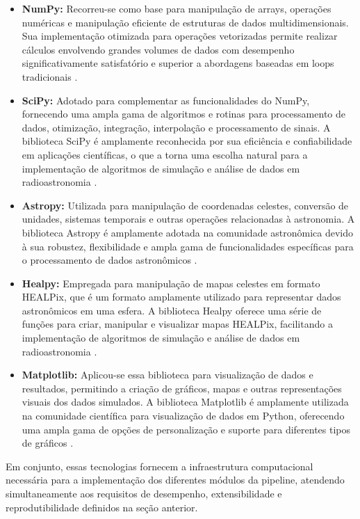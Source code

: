 \begin{itemize}
    \item \textbf{NumPy:} Recorreu-se como base para manipulação de arrays, operações numéricas e manipulação eficiente de estruturas de dados multidimensionais. Sua implementação otimizada para operações vetorizadas permite realizar cálculos envolvendo grandes volumes de dados com desempenho significativamente satisfatório e superior a abordagens baseadas em loops tradicionais \cite{harris2020array}.
    \item \textbf{SciPy:} Adotado para complementar as funcionalidades do NumPy, fornecendo uma ampla gama de algoritmos e rotinas para processamento de dados, otimização, integração, interpolação e processamento de sinais. A biblioteca SciPy é amplamente reconhecida por sua eficiência e confiabilidade em aplicações científicas, o que a torna uma escolha natural para a implementação de algoritmos de simulação e análise de dados em radioastronomia \cite{virtanen2020scipy}.
    \item \textbf{Astropy:} Utilizada para manipulação de coordenadas celestes, conversão de unidades, sistemas temporais e outras operações relacionadas à astronomia. A biblioteca Astropy é amplamente adotada na comunidade astronômica devido à sua robustez, flexibilidade e ampla gama de funcionalidades específicas para o processamento de dados astronômicos \cite{Astropy2022}.
    \item \textbf{Healpy:} Empregada para manipulação de mapas celestes em formato HEALPix, que é um formato amplamente utilizado para representar dados astronômicos em uma esfera. A biblioteca Healpy oferece uma série de funções para criar, manipular e visualizar mapas HEALPix, facilitando a implementação de algoritmos de simulação e análise de dados em radioastronomia \cite{gorski2005healpix}.
    \item \textbf{Matplotlib:} Aplicou-se essa biblioteca para visualização de dados e resultados, permitindo a criação de gráficos, mapas e outras representações visuais dos dados simulados. A biblioteca Matplotlib é amplamente utilizada na comunidade científica para visualização de dados em Python, oferecendo uma ampla gama de opções de personalização e suporte para diferentes tipos de gráficos \cite{hunter2007matplotlib}.
\end{itemize}

Em conjunto, essas tecnologias fornecem a infraestrutura computacional necessária para a implementação dos diferentes módulos da pipeline, atendendo simultaneamente aos requisitos de desempenho, extensibilidade e reprodutibilidade definidos na seção anterior.

